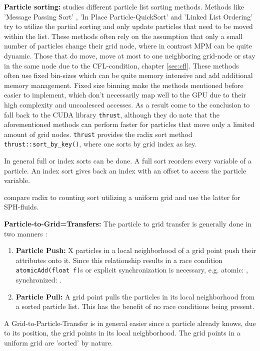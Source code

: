 \documentclass[m,times]{cgMA}
\begin{document}
\textbf{Particle sorting:} \cite{PIC:GPU} studies different particle list sorting methods. Methods like 'Message Passing Sort' \cite{kong2011particle} \cite{decyk2011adaptable}, 'In Place Particle-QuickSort' \cite{stantchev2008fast} and 'Linked List Ordering' \cite{burau2010picongpu} try to utilize the partial sorting and only update particles that need to be moved within the list. These methods often rely on the assumption that only a small number of particles change their grid node, where in contrast MPM can be quite dynamic. Those that do move, move at most to one neighboring grid-node or stay in the same node due to the CFL-condition, chapter \ref{sec:cfl}. These methods often use fixed bin-sizes which can be quite memory intensive and add additional memory management. Fixed size binning make the methods mentioned before easier to implement, which don't necessarily map well to the GPU due to their high complexity and uncoalesced accesses. As a result \cite{PIC:GPU} come to the conclusion to fall back to the CUDA library \texttt{thrust}, although they do note that the aforementioned methods can perform faster for particles that move only a limited amount of grid nodes. \texttt{thrust} provides the radix sort method \texttt{thrust::sort\_by\_key()}, where one sorts by grid index as key.

In general full or index sorts can be done. A full sort reorders every variable of a particle. An index sort gives back an index with an offset to access the particle variable.

\cite{NVIDIA:NNSEARCH} compare radix to counting sort utilizing a uniform grid and use the latter for SPH-fluids.

\textbf{Particle-to-Grid=Transfers:} The particle to grid transfer is generally done in two manners \cite{stantchev2008fast}:
\begin{enumerate}
  \item \textbf{Particle Push:} X particles in a local neighborhood of a grid point push their attributes onto it. Since this relationship results in a race condition \texttt{atomicAdd(float f)}s or explicit synchronization is necessary, e.g. a\-tomic: \cite{PIC:GPU}, synchronized: \cite{FRANCESCO:ROSSI}.
  \item \textbf{Particle Pull:} A grid point pulls the particles in its local neighborhood from a sorted particle list. This has the benefit of no race conditions being present.
\end{enumerate}
A Grid-to-Particle-Transfer is in general easier since a particle already knows, due to its position, the grid points in its local neighborhood. The grid points in a uniform grid are 'sorted' by nature.
\end{document}
